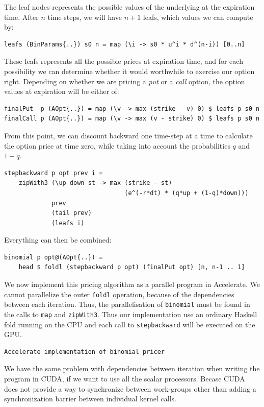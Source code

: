 \documentclass[preprint]{sigplanconf}
\begin{document}
The leaf nodes represents the possible values of the underlying at
the expiration time. After $n$ time steps, we will have $n+1$ leafs, which
values we can compute by:
\begin{verbatim}
leafs (BinParams{..}) s0 n = map (\i -> s0 * u^i * d^(n-i)) [0..n]
\end{verbatim}
These leafs represents all the possible prices at expiration time, and
for each possibility we can determine whether it would worthwhile to
exercise our option right. Depending on whether we are pricing a
\emph{put} or a \emph{call} option, the option values at expiration
will be either of:
\begin{verbatim}
finalPut  p (AOpt{..}) = map (\v -> max (strike - v) 0) $ leafs p s0 n
finalCall p (AOpt{..}) = map (\v -> max (v - strike) 0) $ leafs p s0 n
\end{verbatim}
From this point, we can discount backward one time-step at a time to
calculate the option price at time zero, while taking into account the
probabilities $q$ and $1-q$.
\begin{verbatim}
stepbackward p opt prev i =
    zipWith3 (\up down st -> max (strike - st) 
                                 (e^(-r*dt) * (q*up + (1-q)*down)))
             prev
             (tail prev)
             (leafs i)
\end{verbatim}
Everything can then be combined:
\begin{verbatim}
binomial p opt@(AOpt{..}) =
    head $ foldl (stepbackward p opt) (finalPut opt) [n, n-1 .. 1]
\end{verbatim}

We now implement this pricing algorithm as a parallel program in
Accelerate. We cannot parallelize the outer \verb|foldl| operation,
because of the dependencies between each iteration. Thus, the
parallelisation of \verb|binomial| must be found in the calls to
\verb|map| and \verb|zipWith3|. Thus our implementation use an
ordinary Haskell fold running on the CPU and each call to
\verb|stepbackward| will be executed on the GPU.
\begin{verbatim}
Accelerate implementation of binomial pricer
\end{verbatim}

We have the same problem with dependencies between iteration when
writing the program in CUDA, if we want to use all the scalar
processors. Becase CUDA does not provide a way to synchronize between
work-groups other than adding a synchronization barrier between
individual kernel calls.
\end{document}
